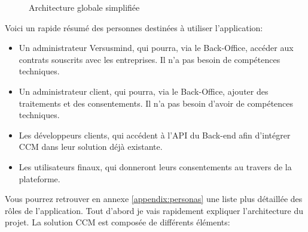 \documentclass[12pt, a4paper]{report}
\begin{document}
\begin{figure}[H]
\begin{center}
    \end{center}
    \caption{Architecture globale simplifiée}
\end{figure}
Voici un rapide résumé des personnes destinées à utiliser l'application:
\begin{itemize}
    \item Un administrateur Versusmind, qui pourra, via le Back-Office, accéder aux contrats souscrits avec les entreprises. Il n'a pas besoin de compétences techniques.
    \item Un administrateur client, qui pourra, via le Back-Office, ajouter des traitements et des consentements. Il n'a pas besoin d'avoir de compétences techniques.
    \item Les développeurs clients, qui accédent à l'API du Back-end afin d'intégrer CCM dans leur solution déjà existante.
    \item Les utilisateurs finaux, qui donneront leurs consentements au travers de la plateforme.
\end{itemize}
Vous pourrez retrouver en annexe \ref{appendix:personas} une liste plus détaillée des rôles de l'application.
Tout d'abord je vais rapidement expliquer l'architecture du projet.
La solution CCM est composée de différents éléments:
\end{document}

